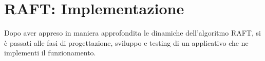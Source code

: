 \chapter{RAFT: Implementazione}
	Dopo aver appreso in maniera approfondita le dinamiche dell'algoritmo RAFT, si è passati alle fasi di progettazione, sviluppo e testing di un applicativo che ne implementi il funzionamento. 






